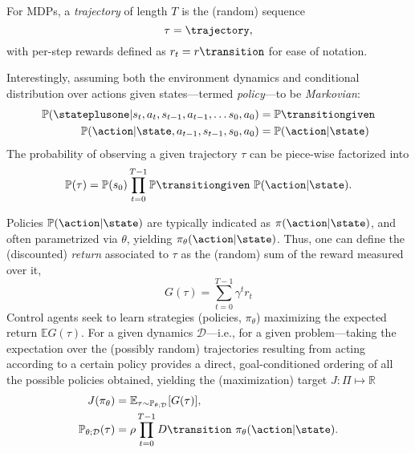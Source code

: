For MDPs, a \emph{trajectory} of length \(T\) is the (random) sequence
\begin{equation}\label{eq:trajectory_definition}
    \tau = \trajectory,
\end{equation}
with per-step rewards defined as \(r_t = r \transition \) for ease of notation.

Interestingly, assuming both the environment dynamics and conditional distribution over actions given states---termed \emph{policy}---to be \emph{Markovian}:
%
\begin{align}
\mathbb P(\stateplusone \vert s_t, a_t, s_{t-1}, a_{t-1}, \dots s_0, a_0 ) &= \mathbb P \transitiongiven \label{eq:dynamics_markovian} \\
\mathbb P(\action \vert \state, a_{t-1}, s_{t-1}, s_0, a_0) &= \mathbb P(\action \vert \state) \label{eq:policy_markovian}
\end{align}
%
The probability of observing a given trajectory \( \tau \) can be piece-wise factorized into
\begin{equation}\label{eq:traj_prob}
    \mathbb P(\tau) = \mathbb P (s_0) \prod_{t=0}^{T-1} \mathbb P \transitiongiven \ \mathbb P(\action \vert \state).
\end{equation}

Policies \( \mathbb P(\action \vert \state) \) are typically indicated as \( \pi(\action \vert \state) \), and often parametrized via \( \theta \), yielding \( \pi_\theta (\action \vert \state )\).
Thus, one can define the (discounted) \emph{return} associated to \( \tau \) as the (random) sum of the reward measured over it,
\[
    G(\tau) = \sum_{t=0}^{T-1} \gamma^{t} r_t
\]
Control agents seek to learn strategies (policies, \( \pi_\theta \)) maximizing the expected return \( \mathbb E G(\tau) \). 
For a given dynamics \( \mathcal D \)---i.e., for a given problem---taking the expectation over the (possibly random) trajectories resulting from acting according to a certain policy provides a direct, goal-conditioned ordering of all the possible policies obtained, yielding the (maximization) target \( J : \Pi \mapsto \mathbb R \)
\begin{align}
    J(\pi_\theta) &= \mathbb E_{\tau \sim \mathbb P_{\theta; \mathcal D}} \left[ G(\tau) \right], \label{eq:RL-j-function} \\
    \mathbb P_{\theta; \mathcal D} (\tau) &= \rho \prod_{t=0}^{T-1} \mathbb \mathcal D \transition \ \pi_\theta (\action \vert \state).\label{eq:traj-probabilities-for-policies}
\end{align}

